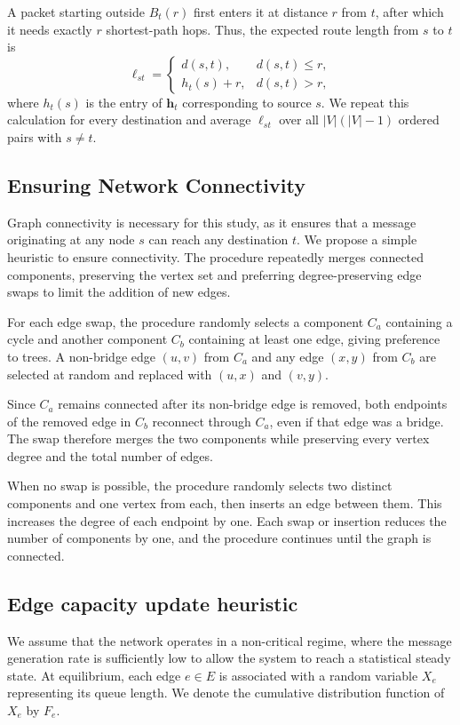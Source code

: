 \documentclass[a4paper]{article}
\begin{document}
A packet starting outside $B_t(r)$ first enters it at distance $r$
from $t$, after which it needs exactly $r$ shortest-path hops. Thus,
the expected route length from $s$ to $t$ is
\begin{equation}
    \ell_{st}=
    \begin{cases}
        d(s,t), & d(s,t) \leq r, \\
        h_t(s)+r, & d(s,t)>r,
    \end{cases}
\end{equation}
where $h_t(s)$ is the entry of $\mathbf{h}_t$ corresponding to source
$s$. We repeat this calculation for every destination and average
$\ell_{st}$ over all $|V|(|V|-1)$ ordered pairs with $s \ne t$.

\subsection{Ensuring Network Connectivity}

Graph connectivity is necessary for this study, as it ensures that a
message originating at any node $s$ can reach any destination $t$.
We propose a simple heuristic to ensure connectivity.
The procedure repeatedly merges connected components, preserving the
vertex set and preferring degree-preserving edge swaps to limit the
addition of new edges.

For each edge swap, the procedure randomly selects a component $C_a$
containing a cycle and another component $C_b$ containing at least one
edge, giving preference to trees. A non-bridge edge $(u,v)$ from $C_a$
and any edge $(x,y)$ from $C_b$ are selected at random and replaced
with $(u,x)$ and $(v,y)$.

Since $C_a$ remains connected after its non-bridge edge is removed,
both endpoints of the removed edge in $C_b$ reconnect through $C_a$, even if that
edge was a bridge. The swap therefore merges the two components
while preserving every vertex degree and the total number of edges.

When no swap is possible, the procedure randomly selects two distinct
components and one vertex from each, then inserts an edge between them. This
increases the degree of each endpoint by one. Each swap or insertion
reduces the number of components by one, and the procedure continues
until the graph is connected.

\subsection{Edge capacity update heuristic}
We assume that the network operates in a non-critical regime,
where the message generation rate is sufficiently low to
allow the system to reach a statistical steady state.
At equilibrium, each edge $e \in E$ is associated with
a random variable $X_e$ representing its queue length.
We denote the cumulative distribution function of $X_e$ by $F_e$.
\end{document}
